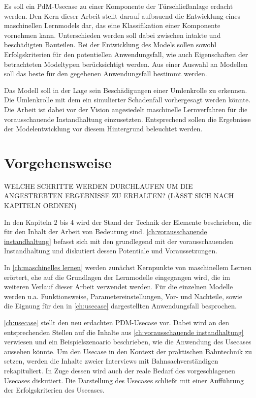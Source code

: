 Es soll ein PdM-Usecase zu einer Komponente der Türschließanlage erdacht werden. Den Kern dieser Arbeit stellt darauf aufbauend die Entwicklung eines maschinellen Lernmodels dar, das eine Klassifikation einer Komponente vornehmen kann. Unterschieden werden soll dabei zwischen intakte und beschädigten Bauteilen. Bei der Entwicklung des Models sollen sowohl Erfolgskriterien für den potentiellen Anwendungsfall, wie auch Eigenschaften der betrachteten Modeltypen berücksichtigt werden. Aus einer Auswahl an Modellen soll das beste für den gegebenen Anwendungsfall bestimmt werden.

Das Modell soll in der Lage sein Beschädigungen einer Umlenkrolle zu erkennen. Die Umlenkrolle mit dem ein simulierter Schadenfall vorhergesagt werden könnte. Die Arbeit ist dabei vor der Vision angesiedelt maschinelle Lernverfahren für die vorausschauende Instandhaltung einzusetzten. Entsprechend sollen die Ergebnisse der Modelentwicklung vor diesem Hintergrund beleuchtet werden.

\section{Vorgehensweise}
\label{sec:vorgehensweise}
WELCHE SCHRITTE WERDEN DURCHLAUFEN UM DIE ANGESTREBTEN ERGEBNISSE ZU ERHALTEN?
(LÄSST SICH NACH KAPITELN ORDNEN)

In den Kapiteln 2 bis 4 wird der Stand der Technik der Elemente beschrieben, die für den Inhalt der Arbeit von Bedeutung sind. \cref{ch:vorausschauende instandhaltung} befasst sich mit den grundlegend mit der vorausschauenden Instandhaltung und diskutiert dessen Potentiale und Voraussetzungen.

In \cref{ch:maschinelles lernen} werden zunächst Kernpunkte von maschinellem Lernen erörtert, ehe auf die Grundlagen der Lernmodelle eingegangen wird, die im weiteren Verlauf dieser Arbeit verwendet werden. Für die einzelnen Modelle werden u.a. Funktionsweise, Parametereinstellungen, Vor- und Nachteile, sowie die Eignung für den in \cref{ch:usecase} dargestellten Anwendungsfall besprochen. 

\cref{ch:usecase} stellt den neu erdachten PDM-Usecase vor. Dabei wird an den entsprechenden Stellen auf die Inhalte aus \cref{ch:vorausschauende instandhaltung} verwiesen und ein Beispielszenoario beschrieben, wie die Anwendung des Usecases aussehen könnte. Um den Usecase in den Kontext der praktischen Bahntechnik zu setzen, werden die Inhalte zweier Interviews mit Bahnsachverständigen rekapituliert. In Zuge dessen wird auch der reale Bedarf des vorgeschlagenen Usecases diskutiert. Die Darstellung des Usecases schließt mit einer Aufführung der Erfolgskriterien des Usecases.

